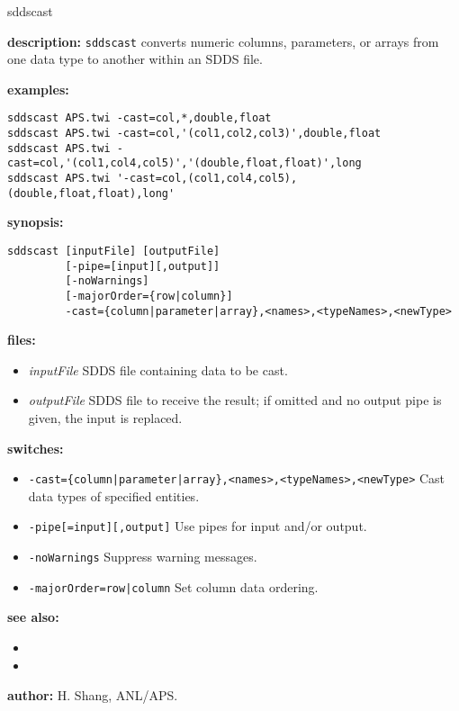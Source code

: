 \begin{sddsprog}{sddscast}
  \item \textbf{description:} \verb|sddscast| converts numeric columns, parameters, or arrays from one data type to another within an SDDS file.
  \item \textbf{examples:}
\begin{verbatim}
sddscast APS.twi -cast=col,*,double,float
sddscast APS.twi -cast=col,'(col1,col2,col3)',double,float
sddscast APS.twi -cast=col,'(col1,col4,col5)','(double,float,float)',long
sddscast APS.twi '-cast=col,(col1,col4,col5),(double,float,float),long'
\end{verbatim}
  \item \textbf{synopsis:}
\begin{verbatim}
sddscast [inputFile] [outputFile]
         [-pipe=[input][,output]]
         [-noWarnings]
         [-majorOrder={row|column}]
         -cast={column|parameter|array},<names>,<typeNames>,<newType>
\end{verbatim}
  \item \textbf{files:}
  \begin{itemize}
    \item \emph{inputFile} \textendash{} SDDS file containing data to be cast.
    \item \emph{outputFile} \textendash{} SDDS file to receive the result; if omitted and no output pipe is given, the input is replaced.
  \end{itemize}
  \item \textbf{switches:}
  \begin{itemize}
    \item \verb+-cast={column|parameter|array},<names>,<typeNames>,<newType>+ \textendash{} Cast data types of specified entities.
    \item \verb|-pipe[=input][,output]| \textendash{} Use pipes for input and/or output.
    \item \verb|-noWarnings| \textendash{} Suppress warning messages.
    \item \verb+-majorOrder=row|column+ \textendash{} Set column data ordering.
  \end{itemize}
  \item \textbf{see also:}
  \begin{itemize}
    \item {}
    \item {}
  \end{itemize}
  \item \textbf{author:} H. Shang, ANL/APS.
\end{sddsprog}
